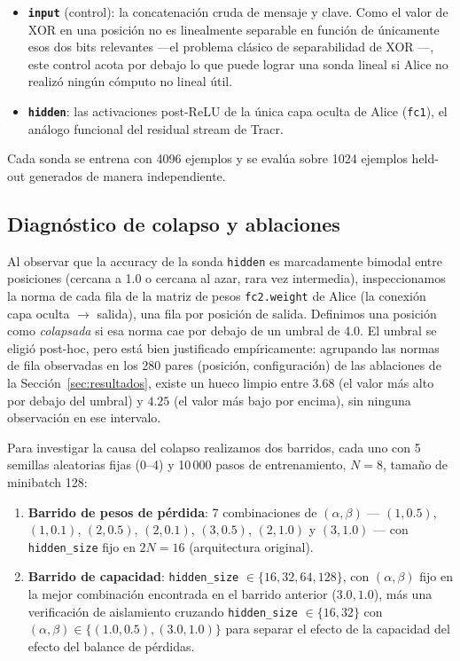 \documentclass[manuscript,screen]{acmart}
\begin{document}
\begin{itemize}
\item \textbf{\texttt{input}} (control): la concatenación cruda de mensaje y clave. Como el
  valor de XOR en una posición no es linealmente separable en función de únicamente esos dos
  bits relevantes —el problema clásico de separabilidad de XOR
  \citep{minsky1969perceptrons}—, este control acota por debajo lo que puede lograr una sonda
  lineal si Alice no realizó ningún cómputo no lineal útil.
\item \textbf{\texttt{hidden}}: las activaciones post-ReLU de la única capa oculta de Alice
  (\texttt{fc1}), el análogo funcional del residual stream de Tracr.
\end{itemize}

Cada sonda se entrena con 4096 ejemplos y se evalúa sobre 1024 ejemplos held-out generados de
manera independiente.

\subsection{Diagnóstico de colapso y ablaciones}

Al observar que la accuracy de la sonda \texttt{hidden} es marcadamente bimodal entre
posiciones (cercana a 1.0 o cercana al azar, rara vez intermedia), inspeccionamos la norma de
cada fila de la matriz de pesos \texttt{fc2.weight} de Alice (la conexión capa oculta
$\rightarrow$ salida), una fila por posición de salida. Definimos una posición como
\emph{colapsada} si esa norma cae por debajo de un umbral de 4.0. El umbral se eligió post-hoc,
pero está bien justificado empíricamente: agrupando las normas de fila observadas en los 280
pares (posición, configuración) de las ablaciones de la Sección~\ref{sec:resultados}, existe un
hueco limpio entre $3.68$ (el valor más alto por debajo del umbral) y $4.25$ (el valor más bajo
por encima), sin ninguna observación en ese intervalo.

Para investigar la causa del colapso realizamos dos barridos, cada uno con 5 semillas
aleatorias fijas (0--4) y 10\,000 pasos de entrenamiento, $N=8$, tamaño de minibatch 128:

\begin{enumerate}
\item \textbf{Barrido de pesos de pérdida}: 7 combinaciones de $(\alpha, \beta)$ ---
  $(1,0.5)$, $(1,0.1)$, $(2,0.5)$, $(2,0.1)$, $(3,0.5)$, $(2,1.0)$ y $(3,1.0)$ ---
  con \texttt{hidden\_size} fijo en $2N=16$ (arquitectura original).
\item \textbf{Barrido de capacidad}: \texttt{hidden\_size} $\in \{16, 32, 64, 128\}$, con
  $(\alpha,\beta)$ fijo en la mejor combinación encontrada en el barrido anterior
  ($3.0, 1.0$), más una verificación de aislamiento cruzando \texttt{hidden\_size} $\in
  \{16,32\}$ con $(\alpha,\beta) \in \{(1.0,0.5), (3.0,1.0)\}$ para separar el efecto de la
  capacidad del efecto del balance de pérdidas.
\end{enumerate}
\end{document}

